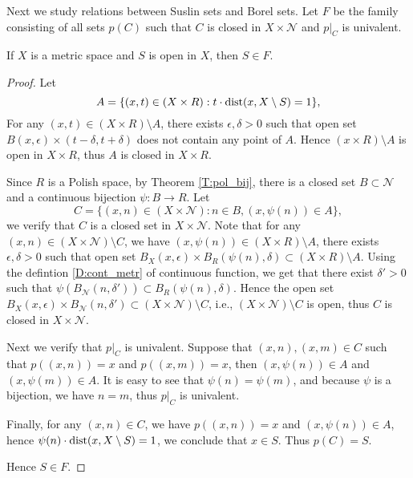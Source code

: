 Next we study relations between Suslin sets and Borel sets. Let $F$ be the
family consisting of all sets $p(C)$ such that $C$ is closed in 
$X\times \mathcal{N}$ and $p|_C$ is univalent.

\begin{lemma}
If $X$ is a metric space and $S$ is open in $X$, then $S\in F$.
\end{lemma}
\begin{proof}
Let 
\[
  A = \{ (x,t)\in (X\times R): t \cdot \operatorname*{dist}(x,X\setminus S) = 1 \},
\]
For any $(x,t)\in (X\times R)\setminus A$, there exists $\epsilon,\delta>0$ such
that open set $B(x,\epsilon)\times (t-\delta,t+\delta)$
does not contain any point of $A$.
Hence $(x\times R)\setminus A$ is open in $X\times R$, thus $A$ is closed 
in $X\times R$.

Since $R$ is a Polish space, by Theorem \ref{T:pol_bij}, there is a closed set
$B\subset\mathcal{N}$ and a continuous bijection $\psi:B\to R$. Let
\[
  C = \{ (x,n)\in (X\times\mathcal{N}) : n\in B, (x,\psi(n))\in A \},
\]
we verify that $C$ is a closed set in $X\times\mathcal{N}$.
Note that for any $(x,n)\in (X\times\mathcal{N})\setminus C$, we have
$(x,\psi(n))\in (X\times R)\setminus A$, 
there exists $\epsilon,\delta>0$ such that open set 
$B_X(x,\epsilon)\times B_R(\psi(n),\delta)\subset (X\times R)\setminus A$.
Using the defintion \ref{D:cont_metr} of continuous function, we get that there
exist $\delta'>0$ such that 
$\psi(B_{\mathcal{N}}(n,\delta'))\subset B_R(\psi(n),\delta)$. Hence the open
set
$B_X(x,\epsilon)\times B_{\mathcal{N}}(n,\delta')\subset
(X\times\mathcal{N})\setminus C$,
i.e., $(X\times\mathcal{N})\setminus C$ is open, thus $C$ is closed
in $X\times\mathcal{N}$.

Next we verify that $p|_C$ is univalent. Suppose that $(x,n),(x,m)\in C$ such
that $p((x,n))=x$ and $p((x,m))=x$, then $(x,\psi(n))\in A$ and 
$(x,\psi(m))\in A$. It is easy to see that $\psi(n)=\psi(m)$, and because $\psi$
is a bijection, we have $n=m$, thus $p|_C$ is univalent.

Finally, for any $(x,n)\in C$, we have $p((x,n))=x$ and $(x,\psi(n))\in A$, 
hence $\psi(n) \cdot \operatorname*{dist}(x,X\setminus S)=1$, we conclude that $x\in S$. Thus 
$p(C)=S$.

Hence $S\in F$.
\end{proof}


